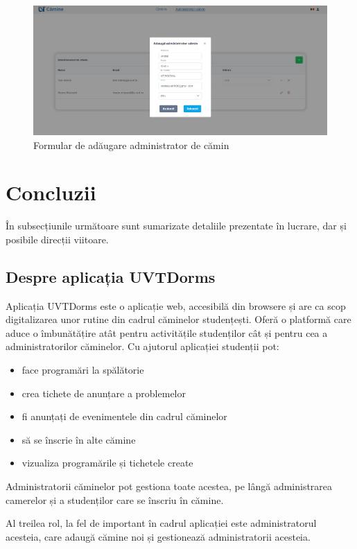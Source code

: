 \documentclass[12pt,a4paper]{report}
\theoremstyle{definition}
\theoremstyle{remark}
\begin{document}
\begin{figure}[H]
    \centering
    \includegraphics[width=0.8\linewidth]{resurse/ghid_utilizare/adugare_adminstrator_camin.png}
    \caption{Formular de adăugare administrator de cămin}
\end{figure}

\chapter{Concluzii}
În subsecțiunile următoare sunt sumarizate detaliile prezentate în lucrare, dar și posibile direcții viitoare.
\section{Despre aplicația UVTDorms}

\par Aplicația UVTDorms este o aplicație web, accesibilă din browsere și are ca scop digitalizarea unor rutine din cadrul căminelor studențești. Oferă o platformă care aduce o îmbunătățire atât pentru activitățile studenților cât și pentru cea a administratorilor căminelor. Cu ajutorul aplicației studenții pot:

\begin{itemize}
    \item face programări la spălătorie
    \item crea tichete de anunțare a problemelor
    \item fi anunțați de evenimentele din cadrul căminelor
    \item să se înscrie în alte cămine
    \item vizualiza programările și tichetele create
\end{itemize}

\par Administratorii căminelor pot gestiona toate acestea, pe lângă administrarea camerelor și a studenților care se înscriu în cămine.

\par Al treilea rol, la fel de important în cadrul aplicației este administratorul acesteia, care adaugă cămine noi și gestionează administratorii acesteia.
\end{document}
